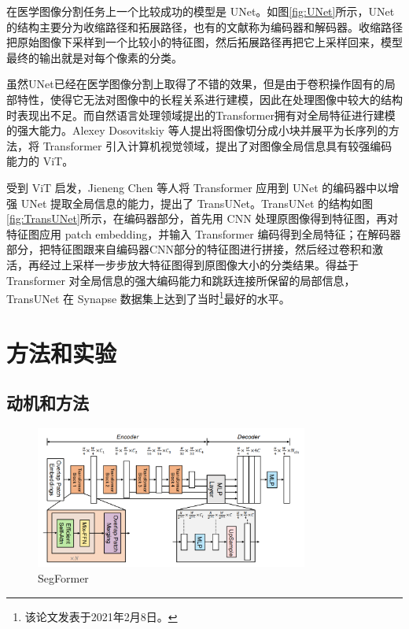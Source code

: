 \documentclass[hyperref,a4paper,UTF8]{ctexart}
\begin{document}
在医学图像分割任务上一个比较成功的模型是 UNet\cite{UNet}。如图\ref{fig:UNet}所示，UNet 的结构主要分为收缩路径和拓展路径，也有的文献称为编码器和解码器。收缩路径把原始图像下采样到一个比较小的特征图，然后拓展路径再把它上采样回来，模型最终的输出就是对每个像素的分类。

虽然UNet已经在医学图像分割上取得了不错的效果，但是由于卷积操作固有的局部特性，使得它无法对图像中的长程关系进行建模，因此在处理图像中较大的结构时表现出不足。而自然语言处理领域提出的Transformer拥有对全局特征进行建模的强大能力。Alexey Dosovitskiy 等人提出将图像切分成小块并展平为长序列的方法，将 Transformer 引入计算机视觉领域，提出了对图像全局信息具有较强编码能力的 ViT\cite{ViT}。

受到 ViT 启发，Jieneng Chen 等人将 Transformer 应用到 UNet 的编码器中以增强 UNet 提取全局信息的能力，提出了 TransUNet\cite{TransUNet}。TransUNet 的结构如图\ref{fig:TransUNet}所示，在编码器部分，首先用 CNN 处理原图像得到特征图，再对特征图应用 patch embedding，并输入 Transformer 编码得到全局特征；在解码器部分，把特征图跟来自编码器CNN部分的特征图进行拼接，然后经过卷积和激活，再经过上采样一步步放大特征图得到原图像大小的分类结果。得益于 Transformer 对全局信息的强大编码能力和跳跃连接所保留的局部信息，TransUNet 在 Synapse 数据集上达到了当时\footnote{该论文发表于2021年2月8日。}最好的水平。

\section{方法和实验\label{sec:方法和实验}}

\subsection{动机和方法}

\begin{figure}[h]
    \centering
    \includegraphics[width=0.8\textwidth]{figures/SegFormer.png}
    \caption{SegFormer}
    \label{fig:SegFormer}
\end{figure}
\end{document}
